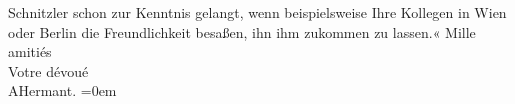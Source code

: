 \begin{ledgroupsized}[t]{13cm}
{{{                        Schnitzler schon zur Kenntnis gelangt,
                     wenn beispielsweise Ihre Kollegen in Wien
                     oder Berlin die Freundlichkeit besaßen, ihn
                     ihm zukommen zu lassen.«}}}\label{K_L02778-6h}\pend
           \pstart
           Mille amitiés{\\[\baselineskip]} Votre dévoué{\\[\baselineskip]}\spacefill\mbox{AHermant.}\pend
           \leftskip=0em{}
         
         \endnumbering{}\end{ledgroupsized}  \newcommand{\dateiname}{L02778}\newcommand{\titel}{Paul Goldmann an Arthur Schnitzler, 22. 6. [1896]}\newcommand{\editorInnen}{Martin Anton Müller und Laura Untner}
      